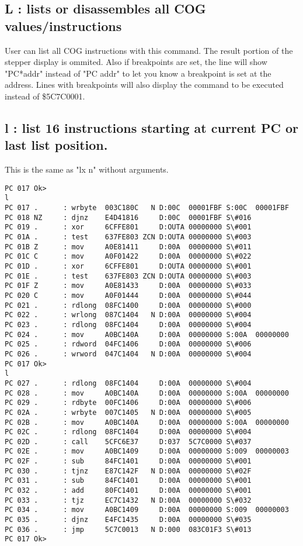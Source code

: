 \documentclass{article}
\numberwithin{equation}{section} %
\begin{document}
\subsection{L      : lists or disassembles all COG values/instructions}

User can list all COG instructions with this command. The result portion of the
stepper display is ommited. Also if breakpoints are set, the line will show "PC*addr"
instead of "PC addr" to let you know a breakpoint is set at the address. Lines with
breakpoints will also display the command to be executed instead of \$5C7C0001.


\subsection{l      : list 16 instructions starting at current PC or last list position.}

This is the same as "lx n" without arguments.

\begin{lstlisting}
PC 017 Ok>
l
PC 017 .      : wrbyte  003C180C   N D:00C  00001FBF S:00C  00001FBF
PC 018 NZ     : djnz    E4D41816     D:00C  00001FBF S\#016
PC 019 .      : xor     6CFFE801     D:OUTA 00000000 S\#001
PC 01A .      : test    637FE803 ZCN D:OUTA 00000000 S\#003
PC 01B Z      : mov     A0E81411     D:00A  00000000 S\#011
PC 01C C      : mov     A0F01422     D:00A  00000000 S\#022
PC 01D .      : xor     6CFFE801     D:OUTA 00000000 S\#001
PC 01E .      : test    637FE803 ZCN D:OUTA 00000000 S\#003
PC 01F Z      : mov     A0E81433     D:00A  00000000 S\#033
PC 020 C      : mov     A0F01444     D:00A  00000000 S\#044
PC 021 .      : rdlong  08FC1400     D:00A  00000000 S\#000
PC 022 .      : wrlong  087C1404   N D:00A  00000000 S\#004
PC 023 .      : rdlong  08FC1404     D:00A  00000000 S\#004
PC 024 .      : mov     A0BC140A     D:00A  00000000 S:00A  00000000
PC 025 .      : rdword  04FC1406     D:00A  00000000 S\#006
PC 026 .      : wrword  047C1404   N D:00A  00000000 S\#004
PC 017 Ok>
l
PC 027 .      : rdlong  08FC1404     D:00A  00000000 S\#004
PC 028 .      : mov     A0BC140A     D:00A  00000000 S:00A  00000000
PC 029 .      : rdbyte  00FC1406     D:00A  00000000 S\#006
PC 02A .      : wrbyte  007C1405   N D:00A  00000000 S\#005
PC 02B .      : mov     A0BC140A     D:00A  00000000 S:00A  00000000
PC 02C .      : rdlong  08FC1404     D:00A  00000000 S\#004
PC 02D .      : call    5CFC6E37     D:037  5C7C0000 S\#037
PC 02E .      : mov     A0BC1409     D:00A  00000000 S:009  00000003
PC 02F .      : sub     84FC1401     D:00A  00000000 S\#001
PC 030 .      : tjnz    E87C142F   N D:00A  00000000 S\#02F
PC 031 .      : sub     84FC1401     D:00A  00000000 S\#001
PC 032 .      : add     80FC1401     D:00A  00000000 S\#001
PC 033 .      : tjz     EC7C1432   N D:00A  00000000 S\#032
PC 034 .      : mov     A0BC1409     D:00A  00000000 S:009  00000003
PC 035 .      : djnz    E4FC1435     D:00A  00000000 S\#035
PC 036 .      : jmp     5C7C0013   N D:000  083C01F3 S\#013
PC 017 Ok>
\end{lstlisting}
\end{document}
